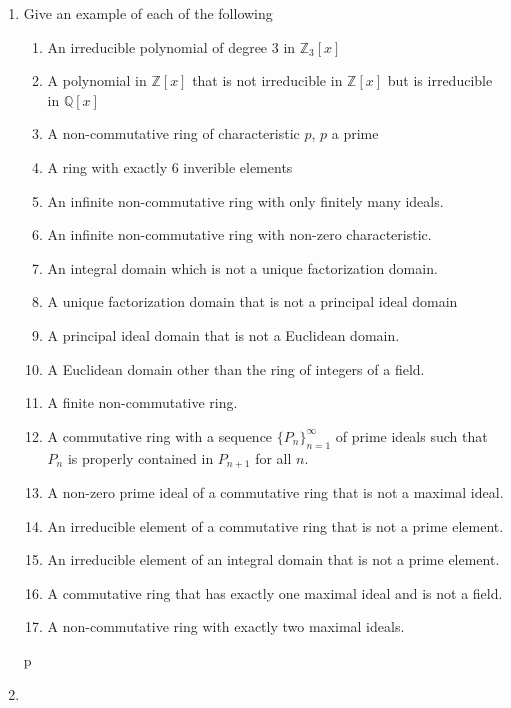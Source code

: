 \documentclass{article}
\theoremstyle{definition}
\begin{document}
\begin{enumerate}
            \item Give an example of each of the following
                \begin{enumerate}
                    \item An irreducible polynomial of degree 3 in $\mathbb{Z}_3[x]$
                    \item A polynomial in $\mathbb{Z}[x]$ that is not irreducible in $\mathbb{Z}[x]$ but is irreducible in $\mathbb{Q}[x]$
                    \item A non-commutative ring of characteristic $p$, $p$ a prime 
                    \item A ring with exactly 6 inverible elements
                    \item An infinite non-commutative ring with only finitely many ideals.
                    \item An infinite non-commutative ring with non-zero characteristic.
                    \item An integral domain which is not a unique factorization domain. 
                    \item A unique factorization domain that is not a principal ideal domain
                    \item A principal ideal domain that is not a Euclidean domain.
                    \item A Euclidean domain other than the ring of integers of a field.
                    \item A finite non-commutative ring.
                    \item A commutative ring with a sequence $\{P_n\}_{n=1}^{\infty}$ of prime ideals such that $P_n$ is properly contained in $P_{n+1}$ for all $n$.
                    \item A non-zero prime ideal of a commutative ring that is not a maximal ideal.
                    \item An irreducible element of a commutative ring that is not a prime element. 
                    \item An irreducible element of an integral domain that is not a prime element. 
                    \item A commutative ring that has exactly one maximal ideal and is not a field.
                    \item A non-commutative ring with exactly two maximal ideals.
                \end{enumerate}
            p
            \item 

\end{enumerate}
\end{document}
